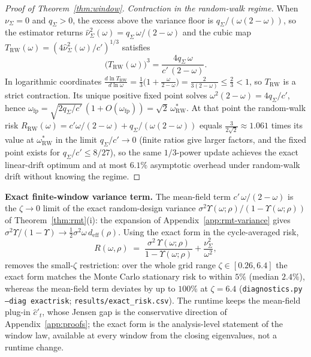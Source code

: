 \begin{proof}[Proof of Theorem~\ref{thm:window}]
\emph{Contraction in the random-walk regime.}
When $\nu_\Sigma = 0$ and $q_\Sigma > 0$, the excess above the variance floor is $q_\Sigma/(\omega(2-\omega))$, so the estimator returns $\widehat\nu^2_\Sigma(\omega) = q_\Sigma\,\omega/(2-\omega)$ and the cubic map $T_{\mathrm{RW}}(\omega) = (4\widehat\nu^2_\Sigma(\omega)/c')^{1/3}$ satisfies
\[
  \bigl(T_{\mathrm{RW}}(\omega)\bigr)^3 = \frac{4q_\Sigma\,\omega}{c'\,(2-\omega)}.
\]
In logarithmic coordinates $\frac{d\ln T_{\mathrm{RW}}}{d\ln \omega} = \frac13\bigl(1 + \frac{\omega}{2-\omega}\bigr) = \frac{2}{3(2-\omega)} \le \frac23 < 1$, so $T_{\mathrm{RW}}$ is a strict contraction.
Its unique positive fixed point solves $\omega^2(2-\omega) = 4q_\Sigma/c'$, hence $\omega_{\mathrm{fp}} = \sqrt{2q_\Sigma/c'}\,(1+O(\omega_{\mathrm{fp}})) = \sqrt2\,\omega^*_{\mathrm{RW}}$.
At that point the random-walk risk $R_{\mathrm{RW}}(\omega) = c'\omega/(2-\omega) + q_\Sigma/(\omega(2-\omega))$ equals $\frac{3}{2\sqrt2} \approx 1.061$ times its value at $\omega^*_{\mathrm{RW}}$ in the limit $q_\Sigma/c'\to 0$ (finite ratios give larger factors, and the fixed point exists for $q_\Sigma/c' \le 8/27$), so the same $1/3$-power update achieves the exact linear-drift optimum and at most $6.1\%$ asymptotic overhead under random-walk drift without knowing the regime.
\end{proof}

\medskip
\noindent\textbf{Exact finite-window variance term.}
The mean-field term $c'\,\omega/(2-\omega)$ is the $\zeta \to 0$ limit of the exact random-design variance $\sigma^2\Upsilon(\omega;\rho)/(1-\Upsilon(\omega;\rho))$ of Theorem~\ref{thm:rmt}(i): the expansion of Appendix~\ref{app:rmt-variance} gives $\sigma^2\Upsilon/(1-\Upsilon) \to \tfrac12\sigma^2\omega\,d_{\mathrm{eff}}(\rho)$.
Using the exact form in the cycle-averaged risk,
\[
R(\omega,\rho) \;=\; \frac{\sigma^2\,\Upsilon(\omega;\rho)}{1-\Upsilon(\omega;\rho)} + \frac{\nu^2_\Sigma}{\omega^2},
\]
removes the small-$\zeta$ restriction: over the whole grid range $\zeta \in [0.26, 6.4]$ the exact form matches the Monte Carlo stationary risk to within $5\%$ (median $2.4\%$), whereas the mean-field term deviates by up to $100\%$ at $\zeta = 6.4$ (\texttt{diagnostics.py} \texttt{--diag exactrisk}; \texttt{results/exact\_risk.csv}).
The runtime keeps the mean-field plug-in $\hat c'_t$, whose Jensen gap is the conservative direction of Appendix~\ref{app:proofs}; the exact form is the analysis-level statement of the window law, available at every window from the closing eigenvalues, not a runtime change.

